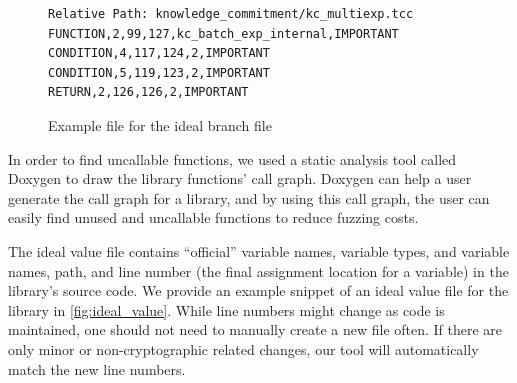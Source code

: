 \begin{figure}[H]
\begin{tcolorbox}
\begin{verbatim}
Relative Path: knowledge_commitment/kc_multiexp.tcc
FUNCTION,2,99,127,kc_batch_exp_internal,IMPORTANT
CONDITION,4,117,124,2,IMPORTANT
CONDITION,5,119,123,2,IMPORTANT
RETURN,2,126,126,2,IMPORTANT
\end{verbatim}
\end{tcolorbox}
\caption{Example file for the ideal branch file}
\label{fig:ideal_branch}
\end{figure}


In order to find uncallable functions, we used a static analysis tool called Doxygen \cite{doxygen} to draw the library functions' call graph. %
Doxygen can help a user generate the call graph for a library, and by using this call graph, the user can easily find unused and uncallable functions to reduce fuzzing costs.

%
The ideal value file contains ``official'' variable names, variable types, and variable names, path, and line number (the final assignment location for a variable) in the library's source code. We provide an example snippet of an ideal value file for the \libsnark library in \autoref{fig:ideal_value}.
While line numbers might change as code is maintained, one should not need to manually create a new file often.  If there are only minor or non-cryptographic related changes, our tool will automatically match the new line numbers.


